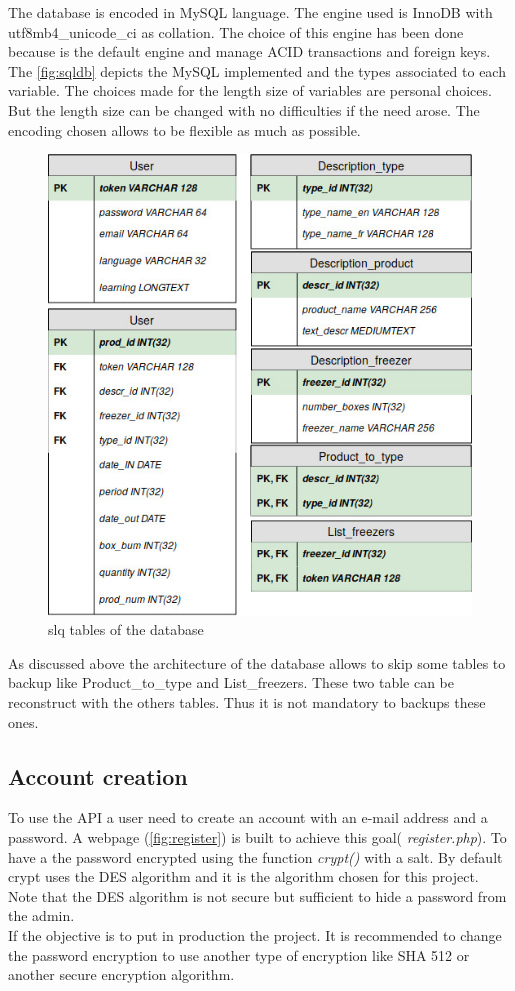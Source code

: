 The database is encoded in MySQL language. The engine used is InnoDB with utf8mb4\_unicode\_ci as collation. The choice of this engine has been done because is the default engine and manage ACID transactions and foreign keys. The \autoref{fig:sqldb} depicts the MySQL implemented and the types associated to each variable. The choices made for the length size of variables are personal choices. But the length size can be changed with no difficulties if the need arose. The encoding chosen allows to be flexible as much as possible.

\begin{figure}[H]
\centering
\includegraphics[scale=0.5]{./images/sqldb.jpg}
\caption{slq tables of the database}
\label{fig:sqldb}
\end{figure}

As discussed above the architecture of the database allows to skip some tables to backup like Product\_to\_type and List\_freezers. These two table can be reconstruct with the others tables. Thus it is not mandatory to backups these ones.

\subsection{Account creation}
To use the API a user need to create an account with an e-mail address and a password. A webpage (\autoref{fig:register}) is built to achieve this goal( \textit{register.php}). To have a the password encrypted using the function \textit{crypt()} with a salt. By default crypt uses the DES algorithm and it is the algorithm chosen for this project. Note that the DES algorithm is not secure but sufficient to hide a password from the admin.\\
If the objective is to put in production the project. It is recommended to change the  password encryption to use another type of encryption like SHA 512 or another secure encryption algorithm. \\


